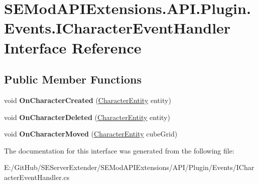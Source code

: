 \hypertarget{interface_s_e_mod_a_p_i_extensions_1_1_a_p_i_1_1_plugin_1_1_events_1_1_i_character_event_handler}{}\section{S\+E\+Mod\+A\+P\+I\+Extensions.\+A\+P\+I.\+Plugin.\+Events.\+I\+Character\+Event\+Handler Interface Reference}
\label{interface_s_e_mod_a_p_i_extensions_1_1_a_p_i_1_1_plugin_1_1_events_1_1_i_character_event_handler}
\subsection*{Public Member Functions}
\begin{DoxyCompactItemize}
\item 
\hypertarget{interface_s_e_mod_a_p_i_extensions_1_1_a_p_i_1_1_plugin_1_1_events_1_1_i_character_event_handler_a9ab3e36007e692590120a246b95d3c69}{}void {\bfseries On\+Character\+Created} (\hyperlink{class_s_e_mod_a_p_i_internal_1_1_a_p_i_1_1_entity_1_1_sector_1_1_sector_object_1_1_character_entity}{Character\+Entity} entity)\label{interface_s_e_mod_a_p_i_extensions_1_1_a_p_i_1_1_plugin_1_1_events_1_1_i_character_event_handler_a9ab3e36007e692590120a246b95d3c69}

\item 
\hypertarget{interface_s_e_mod_a_p_i_extensions_1_1_a_p_i_1_1_plugin_1_1_events_1_1_i_character_event_handler_a13a45b6f478ba8b185764aa7a298e20f}{}void {\bfseries On\+Character\+Deleted} (\hyperlink{class_s_e_mod_a_p_i_internal_1_1_a_p_i_1_1_entity_1_1_sector_1_1_sector_object_1_1_character_entity}{Character\+Entity} entity)\label{interface_s_e_mod_a_p_i_extensions_1_1_a_p_i_1_1_plugin_1_1_events_1_1_i_character_event_handler_a13a45b6f478ba8b185764aa7a298e20f}

\item 
\hypertarget{interface_s_e_mod_a_p_i_extensions_1_1_a_p_i_1_1_plugin_1_1_events_1_1_i_character_event_handler_a040d1078b3c31bc31dec493ca3e5cce1}{}void {\bfseries On\+Character\+Moved} (\hyperlink{class_s_e_mod_a_p_i_internal_1_1_a_p_i_1_1_entity_1_1_sector_1_1_sector_object_1_1_character_entity}{Character\+Entity} cube\+Grid)\label{interface_s_e_mod_a_p_i_extensions_1_1_a_p_i_1_1_plugin_1_1_events_1_1_i_character_event_handler_a040d1078b3c31bc31dec493ca3e5cce1}

\end{DoxyCompactItemize}


The documentation for this interface was generated from the following file\+:\begin{DoxyCompactItemize}
\item 
E\+:/\+Git\+Hub/\+S\+E\+Server\+Extender/\+S\+E\+Mod\+A\+P\+I\+Extensions/\+A\+P\+I/\+Plugin/\+Events/I\+Character\+Event\+Handler.\+cs\end{DoxyCompactItemize}
